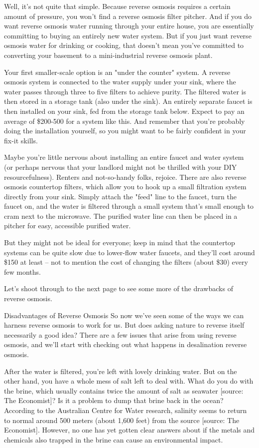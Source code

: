 Well, it's not quite that simple. Because reverse osmosis requires a certain amount of pressure, you won't find a reverse osmosis filter pitcher. And if you do want reverse osmosis water running through your entire house, you are essentially committing to buying an entirely new water system. But if you just want reverse osmosis water for drinking or cooking, that doesn't mean you've committed to converting your basement to a mini-industrial reverse osmosis plant.

Your first smaller-scale option is an "under the counter" system. A reverse osmosis system is connected to the water supply under your sink, where the water passes through three to five filters to achieve purity. The filtered water is then stored in a storage tank (also under the sink). An entirely separate faucet is then installed on your sink, fed from the storage tank below. Expect to pay an average of \$200-500 for a system like this. And remember that you're probably doing the installation yourself, so you might want to be fairly confident in your fix-it skills.

Maybe you're little nervous about installing an entire faucet and water system (or perhaps nervous that your landlord might not be thrilled with your DIY resourcefulness). Renters and not-so-handy folks, rejoice. There are also reverse osmosis countertop filters, which allow you to hook up a small filtration system directly from your sink. Simply attach the "feed" line to the faucet, turn the faucet on, and the water is filtered through a small system that's small enough to cram next to the microwave. The purified water line can then be placed in a pitcher for easy, accessible purified water.

But they might not be ideal for everyone; keep in mind that the countertop systems can be quite slow due to lower-flow water faucets, and they'll cost around \$150 at least -- not to mention the cost of changing the filters (about \$30) every few months.

Let's shoot through to the next page to see some more of the drawbacks of reverse osmosis.

Disadvantages of Reverse Osmosis
So now we've seen some of the ways we can harness reverse osmosis to work for us. But does asking nature to reverse itself necessarily a good idea? There are a few issues that arise from using reverse osmosis, and we'll start with checking out what happens in desalination reverse osmosis.

After the water is filtered, you're left with lovely drinking water. But on the other hand, you have a whole mess of salt left to deal with. What do you do with the brine, which usually contains twice the amount of salt as seawater [source: The Economist]? Is it a problem to dump that brine back in the ocean? According to the Australian Centre for Water research, salinity seems to return to normal around 500 meters (about 1,600 feet) from the source [source: The Economist]. However, no one has yet gotten clear answers about if the metals and chemicals also trapped in the brine can cause an environmental impact.

